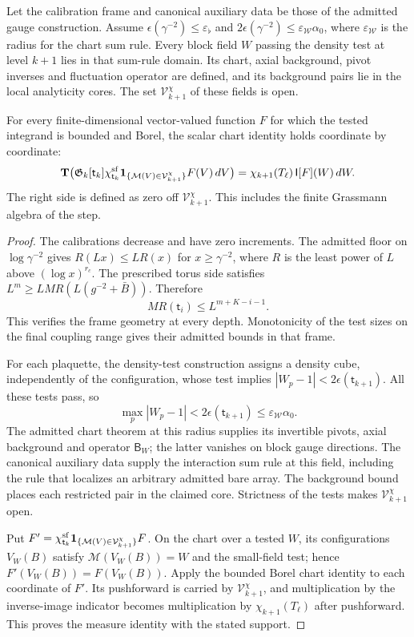\documentclass[11pt,letterpaper,reqno]{amsart}
\makeatletter
\theoremstyle{definition}
\newcommand{\ms@minorstart}{%
  \pushQED{\qed}\renewcommand{\qedsymbol}{$\blacksquare$}}
\newenvironment{lemma}[1][]{\ms@minorstart\ms@lemma[#1]}
  {\popQED\endms@lemma}
\theoremstyle{remark}
\makeatother
\begin{document}
\begin{lemma}[The tested block fields]\label{C-388-38}
Let the calibration frame and canonical auxiliary data be those
of the admitted gauge construction.  Assume
$\epsilon(\gamma^{-2})\le\varepsilon_\flat$ and
$2\epsilon(\gamma^{-2})\le\varepsilon_{\mathcal W}\alpha_0$,
where $\varepsilon_{\mathcal W}$ is the radius for the chart
sum rule.  Every block field $W$ passing the density test at
level $k+1$ lies in that sum-rule domain.  Its chart, axial
background, pivot inverses and fluctuation operator are defined,
and its background pairs lie in the local analyticity cores.
The set $\mathcal V^\chi_{k+1}$ of these fields is open.

For every finite-dimensional vector-valued function $F$ for
which the tested integrand is bounded and Borel, the scalar
chart identity holds coordinate by coordinate:
\[
 \mathbf T\bigl(\mathfrak G_k[\mathsf t_k]
 \chi^{\rm sf}_{\mathsf t_k}
 \mathbf1_{\{\mathcal M(V)\in\mathcal V^\chi_{k+1}\}}
 F(V)\,dV\bigr)
   =\chi_{k+1}(T_\ell)\,\mathsf I[F](W)\,dW.
\]
The right side is defined as zero off $\mathcal V^\chi_{k+1}$.
This includes the finite Grassmann algebra of the step.
\end{lemma}
\begin{proof}
The calibrations decrease and have zero increments.  The
admitted floor on $\log\gamma^{-2}$ gives
$R(Lx)\le LR(x)$ for $x\ge\gamma^{-2}$, where $R$ is the
least power of $L$ above $(\log x)^{r_c}$.  The prescribed torus
side satisfies $L^m\ge LM R(L(g^{-2}+\bar B))$.  Therefore
\[
 M R(\mathsf t_i)\le L^{m+K-i-1}.
\]
This verifies the frame geometry at every depth.  Monotonicity
of the test sizes on the final coupling range gives their
admitted bounds in that frame.

For each plaquette, the density-test construction assigns a
density cube, independently of the configuration, whose test
implies $|W_p-1|<2\epsilon(\mathsf t_{k+1})$.
All these tests pass, so
\[
 \max_p|W_p-1|<2\epsilon(\mathsf t_{k+1})
                         \le\varepsilon_{\mathcal W}\alpha_0.
\]
The admitted chart theorem at this radius supplies its
invertible pivots, axial background and operator $\mathsf B_W$;
the latter vanishes on block gauge directions.  The canonical
auxiliary data supply the interaction sum rule at this field,
including the rule that localizes an arbitrary admitted bare
array.  The background bound places each restricted pair in
the claimed core.  Strictness of the tests makes
$\mathcal V^\chi_{k+1}$ open.

Put $F'=\chi^{\rm sf}_{\mathsf t_k}
\mathbf1_{\{\mathcal M(V)\in\mathcal V^\chi_{k+1}\}}F$.
On the chart over a tested $W$, its configurations $V_W(B)$
satisfy $\mathcal M(V_W(B))=W$ and the small-field test;
hence $F'(V_W(B))=F(V_W(B))$.  Apply the bounded Borel
chart identity to each coordinate of $F'$.  Its pushforward
is carried by $\mathcal V^\chi_{k+1}$, and multiplication
by the inverse-image indicator becomes multiplication by
$\chi_{k+1}(T_\ell)$ after pushforward.  This proves the
measure identity with the stated support.
\end{proof}
\end{document}
